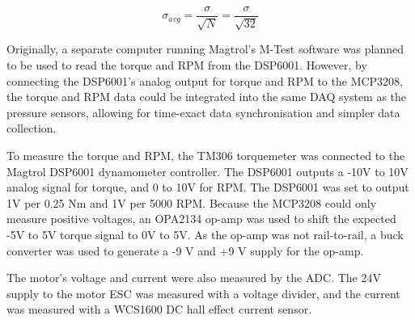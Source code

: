 \begin{equation}
    \sigma_{avg} = \frac{\sigma}{\sqrt{N}} = \frac{\sigma}{\sqrt{32}}
    \label{eq:oversampling}
\end{equation}






Originally, a separate computer running Magtrol's M-Test software was planned to be used to read the torque and RPM from the DSP6001. However, by connecting the DSP6001's analog output for torque and RPM to the MCP3208, the torque and RPM data could be integrated into the same DAQ system as the pressure sensors, allowing for time-exact data synchronisation and simpler data collection.

To measure the torque and RPM, the TM306 torquemeter was connected to the Magtrol DSP6001 dynamometer controller. The DSP6001 outputs a -10V to 10V analog signal for torque, and 0 to 10V for RPM. The DSP6001 was set to output 1V per 0.25 Nm and 1V per 5000 RPM. Because the MCP3208 could only measure positive voltages, an OPA2134 op-amp was used to shift the expected -5V to 5V torque signal to 0V to 5V. As the op-amp was not rail-to-rail, a buck converter was used to generate a -9 V and +9 V supply for the op-amp.

The motor's voltage and current were also measured by the ADC. The 24V supply to the motor ESC was measured with a voltage divider, and the current was measured with a WCS1600 DC hall effect current sensor.


